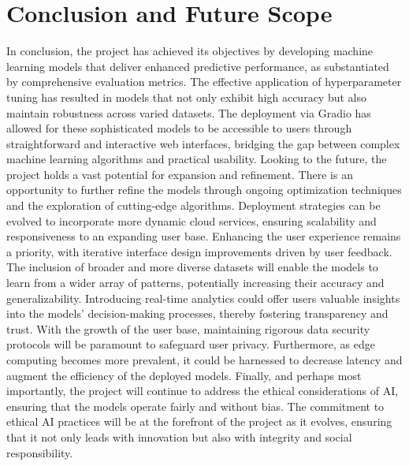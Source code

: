\documentclass[journal,transmag]{J-NaNA}
\begin{document}
\section{Conclusion and Future Scope}
In conclusion, the project has achieved its objectives by developing machine learning models that deliver enhanced predictive performance, as substantiated by comprehensive evaluation metrics. The effective application of hyperparameter tuning has resulted in models that not only exhibit high accuracy but also maintain robustness across varied datasets. The deployment via Gradio has allowed for these sophisticated models to be accessible to users through straightforward and interactive web interfaces, bridging the gap between complex machine learning algorithms and practical usability. Looking to the future, the project holds a vast potential for expansion and refinement. There is an opportunity to further refine the models through ongoing optimization techniques and the exploration of cutting-edge algorithms. Deployment strategies can be evolved to incorporate more dynamic cloud services, ensuring scalability and responsiveness to an expanding user base. Enhancing the user experience remains a priority, with iterative interface design improvements driven by user feedback. The inclusion of broader and more diverse datasets will enable the models to learn from a wider array of patterns, potentially increasing their accuracy and generalizability. Introducing real-time analytics could offer users valuable insights into the models' decision-making processes, thereby fostering transparency and trust. With the growth of the user base, maintaining rigorous data security protocols will be paramount to safeguard user privacy.
Furthermore, as edge computing becomes more prevalent, it could be harnessed to decrease latency and augment the efficiency of the deployed models. Finally, and perhaps most importantly, the project will continue to address the ethical considerations of AI, ensuring that the models operate fairly and without bias. The commitment to ethical AI practices will be at the forefront of the project as it evolves, ensuring that it not only leads with innovation but also with integrity and social responsibility.






% 
%
\end{document}
